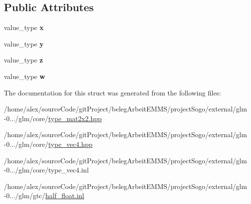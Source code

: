 \subsection*{Public Attributes}
\begin{DoxyCompactItemize}
\item 
\hypertarget{structglm_1_1detail_1_1tvec4_ac96d73b115aec6f701b54cd602beb61f}{value\-\_\-type {\bfseries x}}\label{structglm_1_1detail_1_1tvec4_ac96d73b115aec6f701b54cd602beb61f}

\item 
\hypertarget{structglm_1_1detail_1_1tvec4_a505c36f3d9beec3fd7ca445edeab8c68}{value\-\_\-type {\bfseries y}}\label{structglm_1_1detail_1_1tvec4_a505c36f3d9beec3fd7ca445edeab8c68}

\item 
\hypertarget{structglm_1_1detail_1_1tvec4_a63b99f92f63bef7b4f555c596f547ba9}{value\-\_\-type {\bfseries z}}\label{structglm_1_1detail_1_1tvec4_a63b99f92f63bef7b4f555c596f547ba9}

\item 
\hypertarget{structglm_1_1detail_1_1tvec4_a0759575c2d612ffbf91e6e07d484a09d}{value\-\_\-type {\bfseries w}}\label{structglm_1_1detail_1_1tvec4_a0759575c2d612ffbf91e6e07d484a09d}

\end{DoxyCompactItemize}


The documentation for this struct was generated from the following files\-:\begin{DoxyCompactItemize}
\item 
/home/alex/source\-Code/git\-Project/beleg\-Arbeit\-E\-M\-M\-S/project\-Sogo/external/glm-\/0.../glm/core/\hyperlink{type__mat2x2_8hpp}{type\-\_\-mat2x2.\-hpp}\item 
/home/alex/source\-Code/git\-Project/beleg\-Arbeit\-E\-M\-M\-S/project\-Sogo/external/glm-\/0.../glm/core/\hyperlink{type__vec4_8hpp}{type\-\_\-vec4.\-hpp}\item 
/home/alex/source\-Code/git\-Project/beleg\-Arbeit\-E\-M\-M\-S/project\-Sogo/external/glm-\/0.../glm/core/type\-\_\-vec4.\-inl\item 
/home/alex/source\-Code/git\-Project/beleg\-Arbeit\-E\-M\-M\-S/project\-Sogo/external/glm-\/0.../glm/gtc/\hyperlink{half__float_8inl}{half\-\_\-float.\-inl}\end{DoxyCompactItemize}
